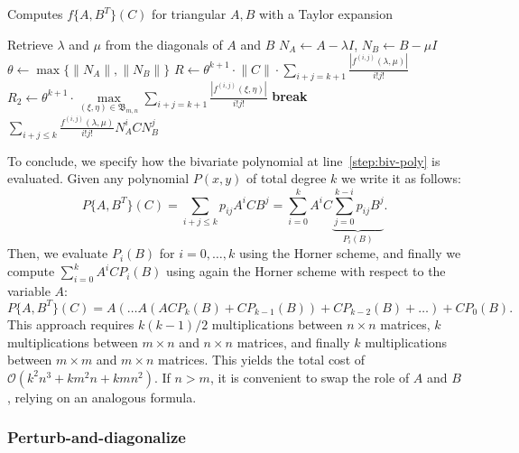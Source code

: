 \documentclass{siamart1116}
\newcommand{\norm}[1]{\lVert#1\rVert}
\begin{document}
\begin{algorithm}[H] 
  	\small 
  	\caption{Computes $f\{A,B^T\}(C)$ for triangular $A,B$ with a Taylor expansion}\label{alg:fun2-atom-taylor}
  	\begin{algorithmic}[1]
  		\State Retrieve $\lambda$ and $\mu$ from the diagonals of $A$ and $B$
  		\State $N_A\gets A-\lambda I$,  $N_B\gets B-\mu I$
  		\State $\theta\gets \max\{\norm{N_A},\norm{N_B}\}$
  		\State $R\gets  \theta^{k+1}
      \cdot \norm{C} \cdot 
        \sum_{i+j=k+1} \frac{|f^{(i,j)}(\lambda, \mu)|}{i!j!}$
            \State $R_2\gets  \theta^{k+1}
      \cdot \max\limits_{(\xi, \eta) \in \mathfrak B_{m,n}}
        \sum_{i+j=k+1} \frac{|f^{(i,j)}(\xi, \eta)|}{i!j!}$
        \State \textbf{break}
        \EndIf
        \EndIf
  		\EndFor
  		\State \Return $\sum_{i+j\leq k} 
    \frac{f^{(i,j)}(\lambda, \mu)}{i!j!}
    N_A^i C N_B^j$ \label{step:biv-poly}
  		\EndProcedure
  	\end{algorithmic}
  \end{algorithm} 

To conclude, we specify how the bivariate polynomial at line~\ref{step:biv-poly} is evaluated. Given any polynomial
$P(x,y)$ of total degree $k$ we write it as follows:
\[
  P\{A, B^T\}(C) = \sum_{i+j \leq k} p_{ij} A^i  C B^j = 
  \sum_{i = 0}^k A^i C 
  \underbrace{\sum_{j = 0}^{k - i} p_{ij} B^j}_{P_i(B)}. 
\]
Then, we evaluate $P_i(B)$ for $i = 0, \ldots, k$ using the
Horner scheme, and finally we compute $\sum_{i=0}^k A^i C P_i(B)$
using again the Horner scheme with respect to the variable $A$:
\[
  P\{A, B^T\}(C) = A ( 
    \ldots A(ACP_{k}(B) + C P_{k-1}(B)) + C P_{k-2}(B) + \ldots
  ) + C P_0(B).
\]
This approach requires $k(k-1)/2$ multiplications between 
$n \times n$ matrices, $k$ multiplications between $m \times n$
and $n \times n$ matrices, and finally $k$ multiplications between
$m \times m$ and $m \times n$ matrices. This yields the total cost
of $\mathcal O(k^2 n^3 + k m^2n + k mn^2)$. If $n > m$, it is 
convenient to swap the role of $A$ and $B$, relying on 
an analogous formula. 

%

\subsubsection{Perturb-and-diagonalize} \label{sec:perturbanddiag}
\end{document}
